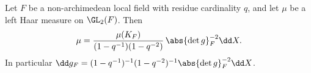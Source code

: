 Let $F$ be a non-archimedean local field with residue cardinality $q$, and let $\mu$ be a left Haar measure on
$\GL_2(F)$. Then
\[
  \mu=\frac{\mu(K_F)}{(1-q^{-1})(1-q^{-2})}\,\abs{\det g}_F^{-2}\dd X .
\]
In particular $\dd g_F=(1-q^{-1})^{-1}(1-q^{-2})^{-1}\abs{\det g}_F^{-2}\dd X$.
